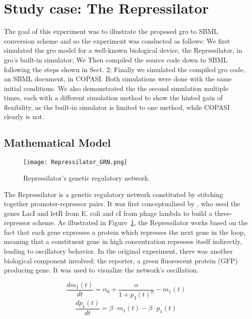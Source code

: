 \documentclass[12pt]{article}
\begin{document}
\section{Study case: The Repressilator}

    The goal of this experiment was to illustrate the proposed gro to SBML conversion scheme and so the experiment was conducted as follows: We first simulated the gro model for a well-known biological device, the Repressilator, in gro's built-in simulator; We Then compiled the source code down to SBML following the steps shown in Sect. 2; Finally we simulated the compiled gro code, an SBML document, in COPASI. Both simulations were done with the same initial conditions. We also demonstrated the the second simulation multiple times, each with a different simulation method to show the hinted gain of flexibility, as the built-in simulator is limited to one method, while COPASI clearly is not.


\subsection{Mathematical Model}

    \begin{figure}[h]
        \centering
        \texttt{[image: Repressilator\_GRN.png]}
        \caption{Repressilator's genetic regulatory network.}
        \label{fig:repressilator_model}
    \end{figure}
    
    The Repressilator is a genetic regulatory network constituted by stitching together promoter-repressor pairs. It was first conceptualized by \cite{Elowitz2000}, who used the genes LacI and letR from E. coli and cI from phage lambda to build a three-repressor scheme. As illustrated in Figure~\ref{fig:repressilator_model}, the Repressilator works based on the fact that each gene expresses a protein which represses the next gene in the loop, meaning that a constituent gene in high concentration represses itself indirectly, leading to oscillatory behavior. In the original experiment, there was another biological component involved: the reporter, a green fluorescent protein (GFP) producing gene. It was used to visualize the network's oscillation.
    
    \begin{multicols}{2}
        \begin{equation*}
            \frac{dm_{1}(t)}{dt} = \alpha_{0} + \frac{\alpha}{1 + p_{3}(t)^{n}} - m_{1}(t)
        \end{equation*}\break
        \begin{equation*}
            \frac{dp_{1}(t)}{dt} = \beta \cdot m_{1}(t) - \beta \cdot p_{1}(t)
        \end{equation*}
    \end{multicols}
    
\end{document}
